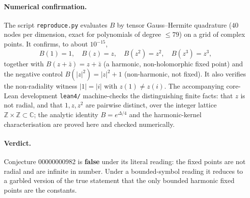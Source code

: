 \documentclass[11pt]{article}
\theoremstyle{definition}
\newcommand{\C}{\mathbb{C}}
\begin{document}
\paragraph{Numerical confirmation.}
The script \texttt{reproduce.py} evaluates $B$ by tensor Gauss--Hermite
quadrature ($40$ nodes per dimension, exact for polynomials of degree $\le79$)
on a grid of complex points. It confirms, to about $10^{-15}$,
\[
  B(1)=1,\quad B(z)=z,\quad B(z^2)=z^2,\quad B(z^3)=z^3,
\]
together with $B(z+\bar z)=z+\bar z$ (a harmonic, non-holomorphic fixed point)
and the negative control $B(|z|^2)=|z|^2+1$ (non-harmonic, not fixed). It also
verifies the non-radiality witness $|1|=|i|$ with $z(1)\neq z(i)$. The
accompanying core-Lean development \texttt{lean4/} machine-checks the
distinguishing finite facts: that $z$ is not radial, and that $1,z,z^2$ are
pairwise distinct, over the integer lattice $\mathbb{Z}\times\mathbb{Z}\subset\C$;
the analytic identity $B=e^{\Delta/4}$ and the harmonic-kernel characterisation
are proved here and checked numerically.

\paragraph{Verdict.}
Conjecture 00000000982 is \textbf{false} under its literal reading: the fixed
points are not radial and are infinite in number. Under a bounded-symbol
reading it reduces to a garbled version of the true statement that the only
bounded harmonic fixed points are the constants.
\end{document}
